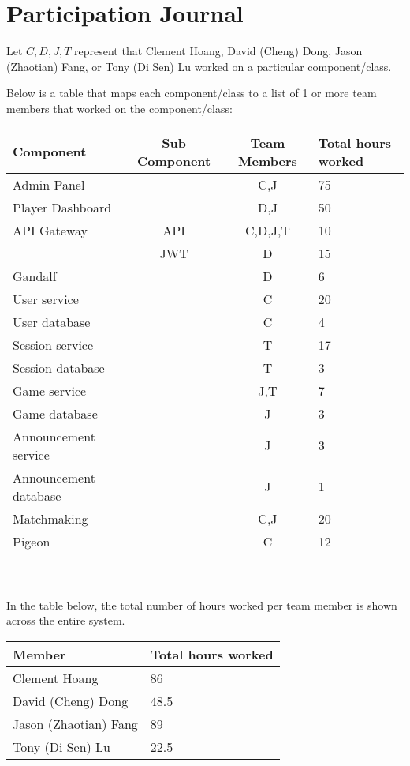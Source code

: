 \documentclass{article}
\begin{document}
\newpage
\section{Participation Journal}
Let $C,D,J,T$ represent that Clement Hoang, David (Cheng) Dong, Jason (Zhaotian) Fang, or Tony (Di Sen) Lu worked on a particular component/class.

Below is a table that maps each component/class to a list of 1 or more team members that worked on the component/class: \\
\begin{tabular}{ | l | c | c | l |  }
	\hline
    Component & Sub Component & Team Members & Total hours worked \\
    \hline
	Admin Panel & & C,J & 75 \\
	\hline
	Player Dashboard & & D,J & 50  \\
	\hline
	API Gateway & API & C,D,J,T & 10 \\
	& JWT & D & 15 \\
	\hline
	Gandalf & & D & 6  \\
	\hline
	User service & & C & 20 \\
	User database & & C & 4 \\
	\hline
	Session service & & T & 17 \\
	Session database & & T & 3 \\
	\hline
	Game service & & J,T & 7 \\
	Game database & & J & 3 \\
	\hline
	Announcement service & & J & 3 \\
	Announcement database & & J & 1 \\
	\hline
	Matchmaking & & C,J & 20 \\
	\hline
	Pigeon & & C & 12 \\
    \hline
\end{tabular} \\ \\

In the table below, the total number of hours worked per team member is shown across the entire system. \\
\begin{tabular}{ | l | l | }
	\hline
    Member & Total hours worked \\
    \hline
	Clement Hoang & 86 \\
	David (Cheng) Dong & 48.5 \\
	Jason (Zhaotian) Fang & 89 \\
	Tony (Di Sen) Lu & 22.5 \\
    \hline
\end{tabular}
\end{document}
